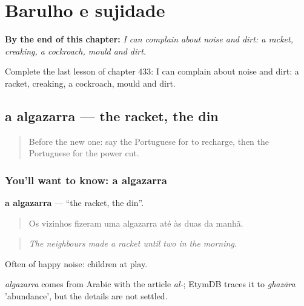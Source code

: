 
\chapter{Barulho e sujidade}
\label{ch:pt-barulho-e-sujidade}

\begin{chapteropening}
\textbf{By the end of this chapter:} \emph{I can complain about noise and dirt: a racket, creaking, a cockroach, mould and dirt.}

Complete the last lesson of chapter 433: I can complain about noise and dirt: a racket, creaking, a cockroach, mould and dirt.
\end{chapteropening}

\section[a algazarra]{a algazarra — the racket, the din}

\label{lesson:PT-C433-algazarra}



\begin{quote}
Before the new one: say the Portuguese for to recharge, then the Portuguese for the power cut.
\end{quote}

\subsection*{You'll want to know: a algazarra}
\textbf{a algazarra} — \textquotedblleft{}the racket, the din\textquotedblright{}.

\begin{quote}
Os vizinhos fizeram uma algazarra até às duas da manhã.
\end{quote}

\begin{quote}
\emph{The neighbours made a racket until two in the morning.}
\end{quote}

Often of happy noise: children at play.

\begin{cousinweb}
\emph{algazarra} comes from Arabic with the article \emph{al-}; EtymDB traces it to \emph{ghazāra} 'abundance', but the details are not settled.
\end{cousinweb}

